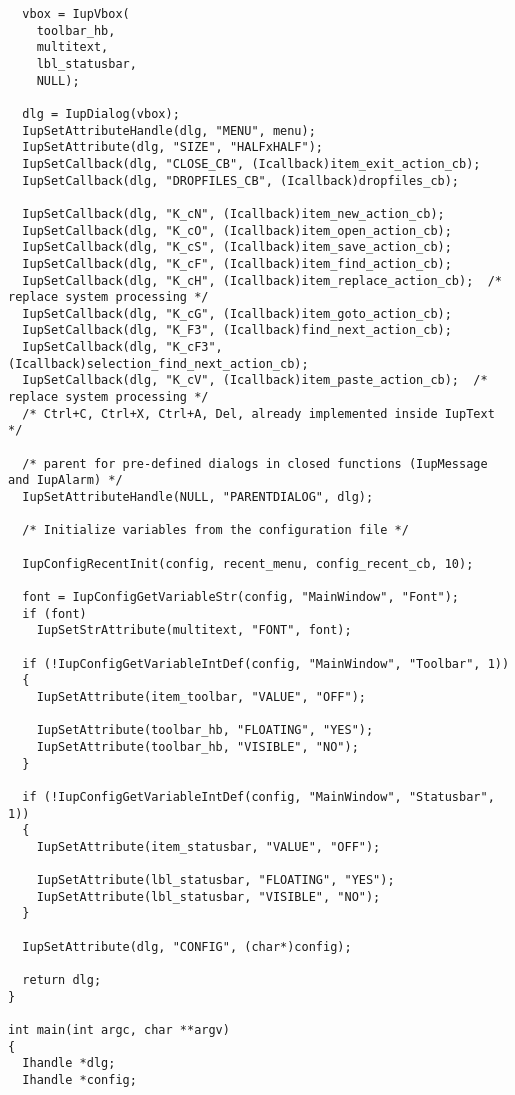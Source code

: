 \documentclass{ctexart}
\begin{document}
\begin{lstlisting}
  vbox = IupVbox(
    toolbar_hb,
    multitext,
    lbl_statusbar,
    NULL);

  dlg = IupDialog(vbox);
  IupSetAttributeHandle(dlg, "MENU", menu);
  IupSetAttribute(dlg, "SIZE", "HALFxHALF");
  IupSetCallback(dlg, "CLOSE_CB", (Icallback)item_exit_action_cb);
  IupSetCallback(dlg, "DROPFILES_CB", (Icallback)dropfiles_cb);

  IupSetCallback(dlg, "K_cN", (Icallback)item_new_action_cb);
  IupSetCallback(dlg, "K_cO", (Icallback)item_open_action_cb);
  IupSetCallback(dlg, "K_cS", (Icallback)item_save_action_cb);
  IupSetCallback(dlg, "K_cF", (Icallback)item_find_action_cb);
  IupSetCallback(dlg, "K_cH", (Icallback)item_replace_action_cb);  /* replace system processing */
  IupSetCallback(dlg, "K_cG", (Icallback)item_goto_action_cb);
  IupSetCallback(dlg, "K_F3", (Icallback)find_next_action_cb);
  IupSetCallback(dlg, "K_cF3", (Icallback)selection_find_next_action_cb);
  IupSetCallback(dlg, "K_cV", (Icallback)item_paste_action_cb);  /* replace system processing */
  /* Ctrl+C, Ctrl+X, Ctrl+A, Del, already implemented inside IupText */

  /* parent for pre-defined dialogs in closed functions (IupMessage and IupAlarm) */
  IupSetAttributeHandle(NULL, "PARENTDIALOG", dlg);

  /* Initialize variables from the configuration file */

  IupConfigRecentInit(config, recent_menu, config_recent_cb, 10);

  font = IupConfigGetVariableStr(config, "MainWindow", "Font");
  if (font)
    IupSetStrAttribute(multitext, "FONT", font);

  if (!IupConfigGetVariableIntDef(config, "MainWindow", "Toolbar", 1))
  {
    IupSetAttribute(item_toolbar, "VALUE", "OFF");

    IupSetAttribute(toolbar_hb, "FLOATING", "YES");
    IupSetAttribute(toolbar_hb, "VISIBLE", "NO");
  }

  if (!IupConfigGetVariableIntDef(config, "MainWindow", "Statusbar", 1))
  {
    IupSetAttribute(item_statusbar, "VALUE", "OFF");

    IupSetAttribute(lbl_statusbar, "FLOATING", "YES");
    IupSetAttribute(lbl_statusbar, "VISIBLE", "NO");
  }

  IupSetAttribute(dlg, "CONFIG", (char*)config);

  return dlg;
}

int main(int argc, char **argv)
{
  Ihandle *dlg;
  Ihandle *config;


\end{lstlisting}
\end{document}
